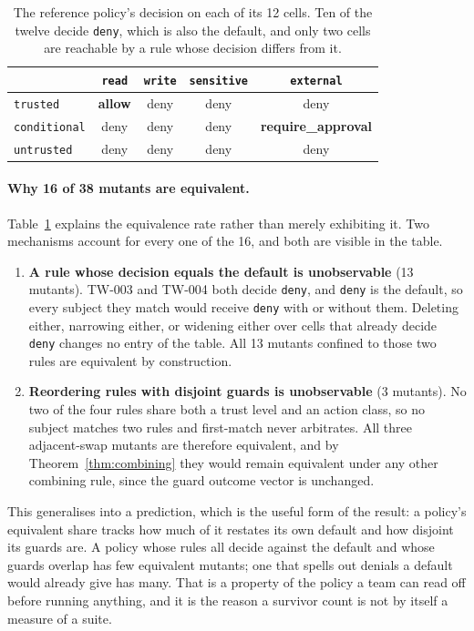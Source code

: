 \documentclass[11pt,a4paper]{article}
\theoremstyle{plain}
\theoremstyle{definition}
\theoremstyle{remark}
\begin{document}
\begin{table}[t]
\centering
\begin{tabular}{lcccc}
\toprule
& \texttt{read} & \texttt{write} & \texttt{sensitive} & \texttt{external} \\
\midrule
\texttt{trusted} & \textbf{allow} & deny & deny & deny \\
\texttt{conditional} & deny & deny & deny & \textbf{require\_approval} \\
\texttt{untrusted} & deny & deny & deny & deny \\
\bottomrule
\end{tabular}
\caption{The reference policy's decision on each of its 12 cells. Ten of the twelve decide
\texttt{deny}, which is also the default, and only two cells are reachable by a rule whose
decision differs from it.}
\label{tab:example}
\end{table}

\paragraph{Why 16 of 38 mutants are equivalent.} Table~\ref{tab:example} explains the
equivalence rate rather than merely exhibiting it. Two mechanisms account for every one of
the 16, and both are visible in the table.

\begin{enumerate}
  \item \textbf{A rule whose decision equals the default is unobservable} (13 mutants).
    TW-003 and TW-004 both decide \texttt{deny}, and \texttt{deny} is the default, so every
    subject they match would receive \texttt{deny} with or without them. Deleting either,
    narrowing either, or widening either over cells that already decide \texttt{deny}
    changes no entry of the table. All 13 mutants confined to those two rules are
    equivalent by construction.
  \item \textbf{Reordering rules with disjoint guards is unobservable} (3 mutants). No two
    of the four rules share both a trust level and an action class, so no subject matches
    two rules and first-match never arbitrates. All three adjacent-swap mutants are
    therefore equivalent, and by Theorem~\ref{thm:combining} they would remain equivalent
    under any other combining rule, since the guard outcome vector is unchanged.
\end{enumerate}

This generalises into a prediction, which is the useful form of the result: a policy's
equivalent share tracks how much of it restates its own default and how disjoint its guards
are. A policy whose rules all decide against the default and whose guards overlap has few
equivalent mutants; one that spells out denials a default would already give has many. That
is a property of the policy a team can read off before running anything, and it is the
reason a survivor count is not by itself a measure of a suite.
\end{document}
